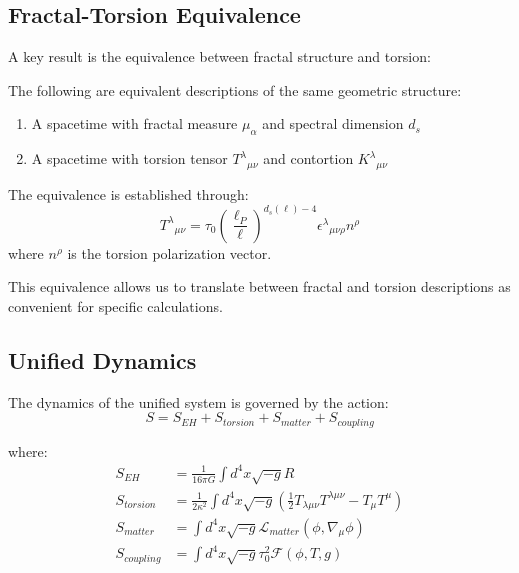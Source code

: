 \subsection{Fractal-Torsion Equivalence}

A key result is the equivalence between fractal structure and torsion:

\begin{theorem}
The following are equivalent descriptions of the same geometric structure:
\begin{enumerate}
    \item A spacetime with fractal measure $\mu_\alpha$ and spectral dimension $d_s$
    \item A spacetime with torsion tensor $T^\lambda{}_{\mu\nu}$ and contortion $K^\lambda{}_{\mu\nu}$
\end{enumerate}
\end{theorem}

The equivalence is established through:
\begin{equation}
    T^\lambda{}_{\mu\nu} = \tau_0 \left(\frac{\ell_P}{\ell}\right)^{d_s(\ell) - 4} \epsilon^\lambda{}_{\mu\nu\rho} n^\rho
\end{equation}
where $n^\rho$ is the torsion polarization vector.

This equivalence allows us to translate between fractal and torsion descriptions as convenient for specific calculations.

\subsection{Unified Dynamics}

The dynamics of the unified system is governed by the action:
\begin{equation}
    S = S_{EH} + S_{torsion} + S_{matter} + S_{coupling}
\end{equation}

where:
\begin{align}
    S_{EH} &= \frac{1}{16\pi G} \int d^4x \sqrt{-g} R \\
    S_{torsion} &= \frac{1}{2\kappa^2} \int d^4x \sqrt{-g} \left(\frac{1}{2}T_{\lambda\mu\nu}T^{\lambda\mu\nu} - T_\mu T^\mu\right) \\
    S_{matter} &= \int d^4x \sqrt{-g} \mathcal{L}_{matter}(\phi, \nabla_\mu\phi) \\
    S_{coupling} &= \int d^4x \sqrt{-g} \tau_0^2 \mathcal{F}(\phi, T, g)
\end{align}

